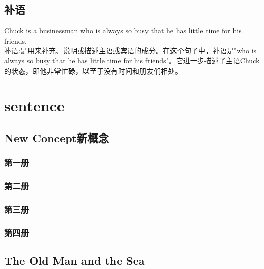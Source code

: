\documentclass[12pt,twiside,a4paper]{ctexbook}
\numberwithin{chapter}{part}
\begin{document}
\section{补语}
Chuck is a businessman who is always so busy that he has little time for his friends. \\
补语:是用来补充、说明或描述主语或宾语的成分。在这个句子中，补语是"who is always so busy that he has little time for his friends"。它进一步描述了主语Chuck的状态，即他非常忙碌，以至于没有时间和朋友们相处。

\chapter{sentence}
\section{New Concept新概念}
\subsection{第一册}
\subsection{第二册}
\subsection{第三册}
\subsection{第四册}
\section{The Old Man and the Sea}
\end{document}
